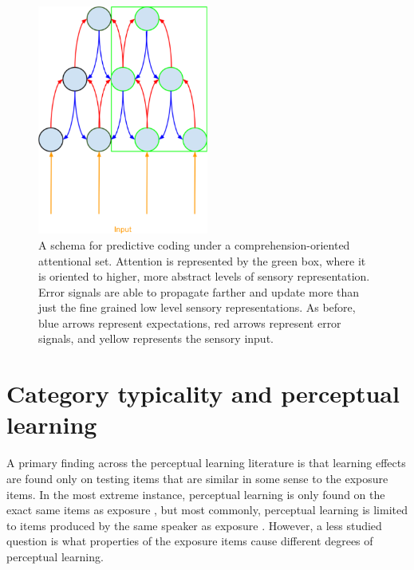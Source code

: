 \begin{figure}[!ht]
\caption{A schema for predictive coding under a comprehension-oriented attentional set. Attention is represented by the green box, where it is oriented to higher, more abstract levels of sensory representation.  Error signals are able to propagate farther and update more than just the fine grained low level sensory representations. As before, blue arrows represent expectations, red arrows represent error signals, and yellow represents the sensory input.}
\label{fig:predictivecodingcomprehension}
\begin{center}
\includegraphics[width=0.5\textwidth]{pictures/comprehension_predictive_coding}
\end{center}
\end{figure}

\section{Category typicality and perceptual learning}
\label{sec:signal}

A primary finding across the perceptual learning literature is that learning effects are found only on testing items that are similar in some sense to the exposure items.  In the most extreme instance, perceptual learning is only found on the exact same items as exposure \citep{Reinisch2014}, but most commonly, perceptual learning is limited to items produced by the same speaker as exposure \citep{Norris2003,Reinisch2013}.  However, a less studied question is what properties of the exposure items cause different degrees of perceptual learning.  

